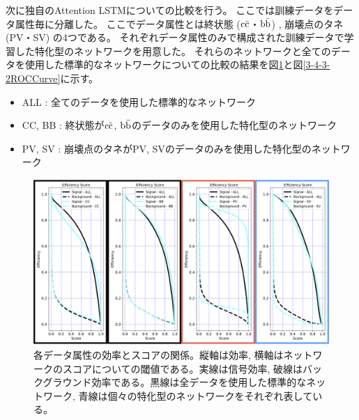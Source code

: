 次に独自のAttention LSTMについての比較を行う。
ここでは訓練データをデータ属性毎に分離した。
ここでデータ属性とは終状態 ($\rm c\bar{c}$・$\rm b\bar{b}$) , 崩壊点のタネ (PV・SV) の4つである。
それぞれデータ属性のみで構成された訓練データで学習した特化型のネットワークを用意した。
それらのネットワークと全てのデータを使用した標準的なネットワークについての比較の結果を図\ref{3-4-3-2EfficiencyCurve}と図\ref{3-4-3-2ROCCurve}に示す。

\begin{itemize}
 \item ALL : 全てのデータを使用した標準的なネットワーク
 \item CC, BB : 終状態が$\rm c\bar{c}$, $\rm b\bar{b}$のデータのみを使用した特化型のネットワーク
 \item PV, SV : 崩壊点のタネがPV, SVのデータのみを使用した特化型のネットワーク
\end{itemize}

\begin{figure}[htbp]
 \centering
 \includegraphics[width=1.0\textwidth, clip]{Figure/3Networks/3-4-3-2EfficiencyCurve.png}
 \caption[各データ属性の効率とスコアの関係]{各データ属性の効率とスコアの関係。縦軸は効率, 横軸はネットワークのスコアについての閾値である。実線は信号効率, 破線はバックグラウンド効率である。黒線は全データを使用した標準的なネットワーク, 青線は個々の特化型のネットワークをそれぞれ表している。}
 \label{3-4-3-2EfficiencyCurve}
\end{figure}

